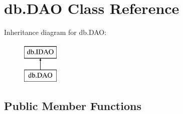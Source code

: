 \hypertarget{classdb_1_1_d_a_o}{}\section{db.\+D\+AO Class Reference}
\label{classdb_1_1_d_a_o}
Inheritance diagram for db.\+D\+AO\+:\begin{figure}[H]
\begin{center}
\leavevmode
\includegraphics[height=2.000000cm]{classdb_1_1_d_a_o}
\end{center}
\end{figure}
\subsection*{Public Member Functions}
